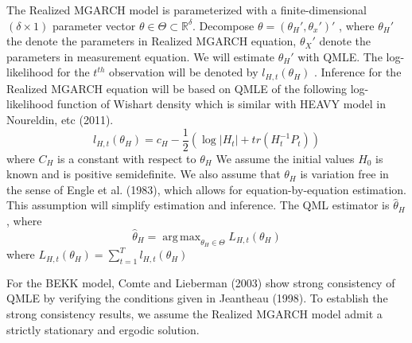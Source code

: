 \documentclass[titlepage,11pt]{article}
\renewcommand{\baselinestretch}{1.48}
\DeclareMathOperator*{\argmax}{arg\,max}
\begin{document}
The Realized MGARCH model is parameterized with a finite-dimensional $(\delta \times 1)$ parameter vector $\theta\in \Theta\subset \mathbb{R}^\delta $. Decompose $\theta = (\theta_H',\theta_x')'$ , where $\theta _H'$ the denote the parameters in Realized MGARCH equation, $\theta _X'$ denote the parameters in measurement equation. We will estimate  $\theta _H'$ with QMLE. The log-likelihood for the $t^{th}$  observation will be denoted by $l_{H,t}(\theta_H)$ . Inference for the Realized MGARCH equation will be based on QMLE of the following log-likelihood function of Wishart density which is similar with HEAVY model in Noureldin, etc (2011).
\begin{equation}
l_{H,t}(\theta_H) = c_H-\frac{1}{2}(\log|H_t|+tr(H_t^{-1}P_t))
\end{equation}
where $C_H$ is a constant with respect to $\theta_H$
We assume the initial values $H_0$ is known and is positive semidefinite. We also assume that $\theta_H$ is variation free in the sense of Engle et al. (1983), which allows for equation-by-equation estimation. This assumption will simplify estimation and inference.
The QML estimator is $\hat{\theta}_H$, where 
\[\hat{\theta}_H=\argmax_{\theta_H \in \Theta} L_{H,t}(\theta_H)\]
where $L_{H,t}(\theta_H) = \sum_{t=1}^T l_{H,t}(\theta_H)$

For the BEKK model, Comte and Lieberman (2003) show strong consistency of QMLE by verifying the conditions given in Jeantheau (1998). To establish the strong consistency results, we assume the Realized MGARCH model admit a strictly stationary and ergodic solution. 



\newpage
\renewcommand{\baselinestretch}{1}
\small
\normalsize


\end{document}
